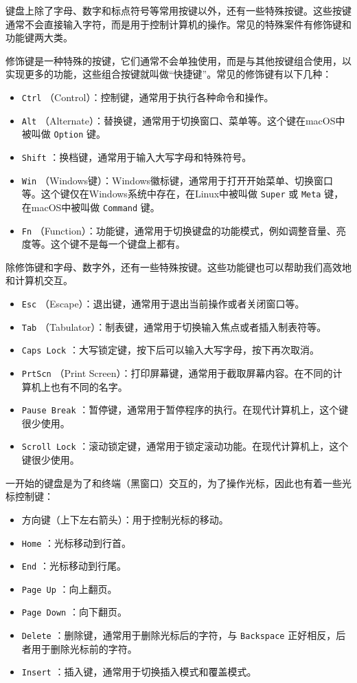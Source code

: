 键盘上除了字母、数字和标点符号等常用按键以外，还有一些特殊按键。这些按键通常不会直接输入字符，而是用于控制计算机的操作。常见的特殊案件有修饰键和功能键两大类。

修饰键是一种特殊的按键，它们通常不会单独使用，而是与其他按键组合使用，以实现更多的功能，这些组合按键就叫做“快捷键”。常见的修饰键有以下几种：
\begin{itemize}
  \item  \texttt{Ctrl} （Control）：控制键，通常用于执行各种命令和操作。
  \item  \texttt{Alt} （Alternate）：替换键，通常用于切换窗口、菜单等。这个键在macOS中被叫做 \texttt{Option} 键。
  \item  \texttt{Shift} ：换档键，通常用于输入大写字母和特殊符号。
  \item  \texttt{Win} （Windows键）：Windows徽标键，通常用于打开开始菜单、切换窗口等。这个键仅在Windows系统中存在，在Linux中被叫做 \texttt{Super} 或 \texttt{Meta} 键，在macOS中被叫做 \texttt{Command} 键。
  \item  \texttt{Fn} （Function）：功能键，通常用于切换键盘的功能模式，例如调整音量、亮度等。这个键不是每一个键盘上都有。
\end{itemize}

除修饰键和字母、数字外，还有一些特殊按键。这些功能键也可以帮助我们高效地和计算机交互。
\begin{itemize}
  \item  \texttt{Esc} （Escape）：退出键，通常用于退出当前操作或者关闭窗口等。
  \item  \texttt{Tab} （Tabulator）：制表键，通常用于切换输入焦点或者插入制表符等。
  \item  \texttt{Caps Lock} ：大写锁定键，按下后可以输入大写字母，按下再次取消。
  \item  \texttt{PrtScn} （Print Screen）：打印屏幕键，通常用于截取屏幕内容。在不同的计算机上也有不同的名字。
  \item  \texttt{Pause Break} ：暂停键，通常用于暂停程序的执行。在现代计算机上，这个键很少使用。
  \item  \texttt{Scroll Lock} ：滚动锁定键，通常用于锁定滚动功能。在现代计算机上，这个键很少使用。
\end{itemize}

一开始的键盘是为了和终端（黑窗口）交互的，为了操作光标，因此也有着一些光标控制键：
\begin{itemize}
  \item 方向键（上下左右箭头）：用于控制光标的移动。
  \item  \texttt{Home} ：光标移动到行首。
  \item  \texttt{End} ：光标移动到行尾。
  \item  \texttt{Page Up} ：向上翻页。
  \item  \texttt{Page Down} ：向下翻页。
  \item  \texttt{Delete} ：删除键，通常用于删除光标后的字符，与 \texttt{Backspace} 正好相反，后者用于删除光标前的字符。
  \item  \texttt{Insert} ：插入键，通常用于切换插入模式和覆盖模式。
\end{itemize}

